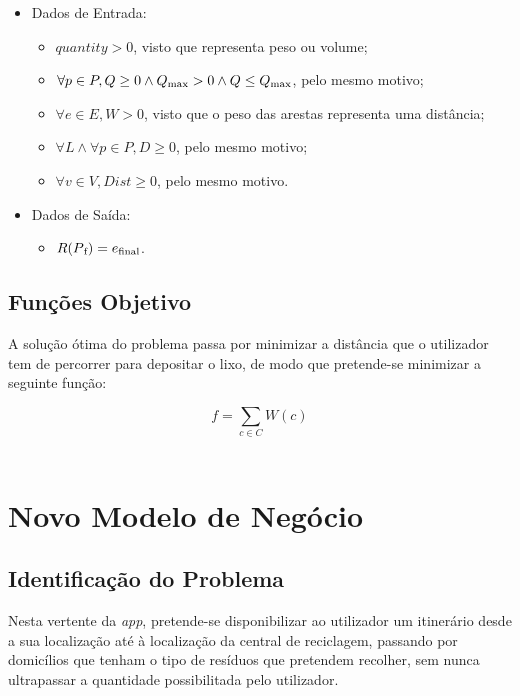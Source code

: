 \documentclass[article, a4paper, 12pt, oneside]{memoir}
\begin{document}
\begin{itemize}

\item Dados de Entrada:

	\begin{itemize}
	\item $quantity > 0$, visto que representa peso ou volume;
	\item $\forall  p \in P, Q \geq 0 \land Q\textsubscript{max} > 0 \land Q \leq Q\textsubscript{max}$, pelo mesmo motivo;
	\item $\forall  e \in E, W > 0$, visto que o peso das arestas representa uma distância;
	\item $\forall L \land \forall p \in P, D \geq 0$, pelo mesmo motivo;
	\item $\forall v \in V, Dist \geq 0$, pelo mesmo motivo.
	\end{itemize}
	
\item Dados de Saída:

	\begin{itemize}
	\item $R(P\textsubscript{f}) = e\textsubscript{final}$.
	\end{itemize}
	
\end{itemize}


\subsection{Funções Objetivo}

A solução ótima do problema passa por minimizar a distância que o utilizador tem de percorrer para depositar o lixo, de modo que pretende-se minimizar a seguinte função:

$$f = \sum_{c \in C} W(c)$$\\


\section{Novo Modelo de Negócio}

\subsection{Identificação do Problema}

Nesta vertente da \textit{app}, pretende-se disponibilizar ao utilizador um itinerário desde a sua localização até à localização da central de reciclagem, passando por domicílios que tenham o tipo de resíduos que pretendem recolher, sem nunca ultrapassar a quantidade possibilitada pelo utilizador.
\end{document}
